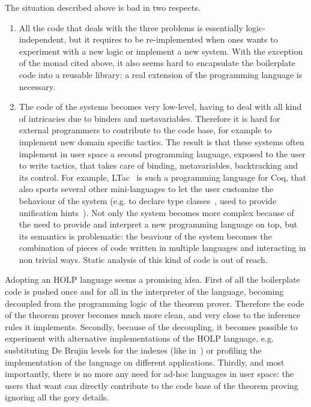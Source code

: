 \documentclass[preprint]{sigplanconf}
\begin{document}
The situation described above is bad in two respects.
\begin{enumerate}
\item All the code that deals with the three problems is essentially logic-independent, but it requires to be re-implemented when ones wants to experiment with a new logic or implement a new system. With the exception of the monad cited above, it also seems hard to encapsulate the boilerplate code into a reusable library: a real extension of the programming language is necessary.
\item The code of the systems becomes very low-level, having to deal with all kind of intricacies due to binders and metavariables. Therefore it is hard for external programmers to contribute to the code base, for example to implement new domain specific tactics. The result is that these systems often implement in user space a second programming language, exposed to the user to write tactics, that takes care of binding, metavariables, backtracking and its control. For example, LTac~\cite{???} is such a programming language for Coq, that also sports several other mini-languages to let the user customize the behaviour of the system (e.g. to declare type classes~\cite{???}, used to provide unification hints~\cite{???}). Not only the system becomes more complex because of the need to provide and interpret a new programming language on top, but its semantics is problematic: the beaviour of the system becomes the combination of pieces of code written in multiple languages and interacting in non trivial ways. Static analysis of this kind of code is out of reach.
\end{enumerate}

Adopting an HOLP language seems a promising idea. First of all the boilerplate code is pushed once and for all in the interpreter of the language, becoming decoupled from the programming logic of the theorem prover. Therefore the code of the theorem prover becomes much more clean, and very close to the inference rules it implements. Secondly, because of the decoupling, it becomes possible to experiment with alternative implementations of the HOLP language, e.g. susbtituting De Brujin levels for the indexes (like in~\cite{???}) or profiling the implementation of the language on different applications. Thirdly, and most importantly, there is no more any need for ad-hoc languages in user space: the users that want can directly contribute to the code base of the theorem proving ignoring all the gory details.
\end{document}
